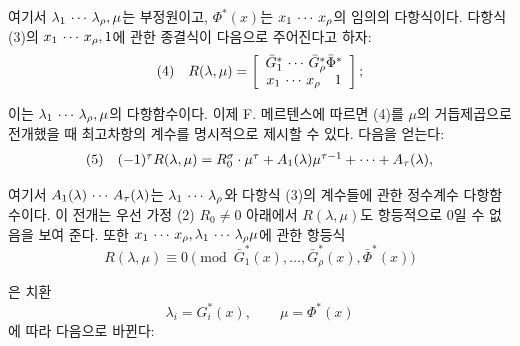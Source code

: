 여기서 $\lambda_1\,\cdots\,\lambda_\rho,\mu$는 부정원이고, $\Phi^*(x)$는 $x_1\,\cdots\, x_\rho$의 임의의 다항식이다. 다항식 (3)의 $x_1\,\cdots\, x_\rho,1$에 관한 종결식이 다음으로 주어진다고 하자:
\[
\begin{array}{@{}l@{\quad}c@{}}
(4)& \displaystyle R(\lambda,\mu)=\left[\begin{array}{cc} \bar G_1^*\rcdots \bar G_\rho^*\bar\Phi^*\\ x_1\rcdots x_\rho\quad 1\end{array}\right];
\end{array}
\]

이는 $\lambda_1\,\cdots\,\lambda_\rho,\mu$의 다항함수이다. 이제 F. 메르텐스에 따르면 (4)를 $\mu$의 거듭제곱으로 전개했을 때 최고차항의 계수를 명시적으로 제시할 수 있다. 다음을 얻는다:
\[
\begin{array}{@{}l@{\quad}c@{}}
(5)& (-1)^\tau R(\lambda,\mu)=R_0^\sigma\cdot\mu^\tau+A_1(\lambda)\mu^{\tau-1}+\cdots+A_\tau(\lambda),
\end{array}
\]

여기서 $A_1(\lambda)\,\cdots\, A_\tau(\lambda)$는 $\lambda_1\,\cdots\,\lambda_\rho$와 다항식 (3)의 계수들에 관한 정수계수 다항함수이다. 이 전개는 우선 가정 (2) $R_0\ne0$ 아래에서 $R(\lambda,\mu)$도 항등적으로 0일 수 없음을 보여 준다. 또한 $x_1\,\cdots\, x_\rho,\lambda_1\,\cdots\,\lambda_\rho\mu$에 관한 항등식
\[
R(\lambda,\mu)\equiv0\pmod{\bar G_1^*(x),\ldots,\bar G_\rho^*(x),\bar\Phi^*(x)}
\]

은 치환
\[
\lambda_i=G_i^*(x),\qquad \mu=\Phi^*(x)
\]
에 따라 다음으로 바뀐다:

